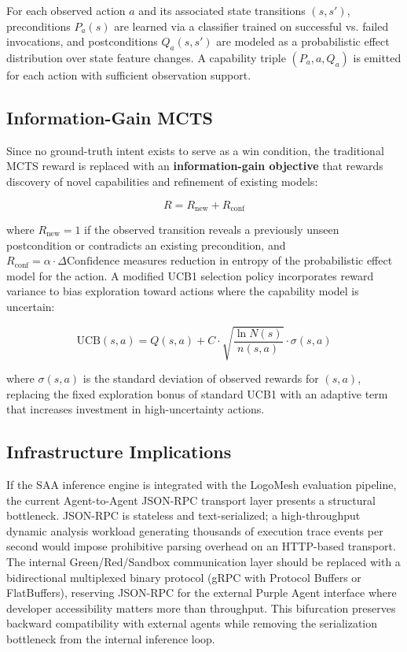 \documentclass[11pt, a4paper]{article}
\begin{document}
For each observed action $a$ and its associated state transitions $(s, s')$, preconditions $P_a(s)$ are learned via a classifier trained on successful vs. failed invocations, and postconditions $Q_a(s, s')$ are modeled as a probabilistic effect distribution over state feature changes. A capability triple $(P_a, a, Q_a)$ is emitted for each action with sufficient observation support.

\subsection{Information-Gain MCTS}

Since no ground-truth intent exists to serve as a win condition, the traditional MCTS reward is replaced with an \textbf{information-gain objective} that rewards discovery of novel capabilities and refinement of existing models:

\[
R = R_{\text{new}} + R_{\text{conf}}
\]

where $R_{\text{new}} = 1$ if the observed transition reveals a previously unseen postcondition or contradicts an existing precondition, and $R_{\text{conf}} = \alpha \cdot \Delta\text{Confidence}$ measures reduction in entropy of the probabilistic effect model for the action. A modified UCB1 selection policy incorporates reward variance to bias exploration toward actions where the capability model is uncertain:

\[
\text{UCB}(s,a) = Q(s,a) + C \cdot \sqrt{\frac{\ln N(s)}{n(s,a)}} \cdot \sigma(s,a)
\]

where $\sigma(s,a)$ is the standard deviation of observed rewards for $(s,a)$, replacing the fixed exploration bonus of standard UCB1 with an adaptive term that increases investment in high-uncertainty actions.

\subsection{Infrastructure Implications}

If the SAA inference engine is integrated with the LogoMesh evaluation pipeline, the current Agent-to-Agent JSON-RPC transport layer presents a structural bottleneck. JSON-RPC is stateless and text-serialized; a high-throughput dynamic analysis workload generating thousands of execution trace events per second would impose prohibitive parsing overhead on an HTTP-based transport. The internal Green/Red/Sandbox communication layer should be replaced with a bidirectional multiplexed binary protocol (gRPC with Protocol Buffers or FlatBuffers), reserving JSON-RPC for the external Purple Agent interface where developer accessibility matters more than throughput. This bifurcation preserves backward compatibility with external agents while removing the serialization bottleneck from the internal inference loop.
\end{document}
